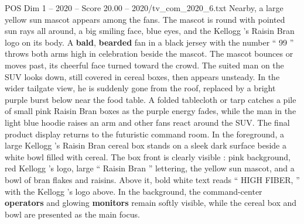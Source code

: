 \begin{textsample}{POS Dim 1 – 2020 – Score 20.00 – 2020/tv\_com\_2020\_6.txt}
Nearby, a large yellow sun mascot appears among the fans.
The mascot is round with pointed sun rays all around, a big smiling face, blue eyes, and the Kellogg ’s Raisin Bran logo on its body.
A \textbf{bald}, \textbf{bearded} fan in a black jersey with the number “ 99 ” throws both arms high in celebration beside the mascot.
The mascot bounces or moves past, its cheerful face turned toward the crowd.
The suited man on the SUV looks down, still covered in cereal boxes, then appears unsteady.
In the wider tailgate view, he is suddenly gone from the roof, replaced by a bright purple burst below near the food table.
A folded tablecloth or tarp catches a pile of small pink Raisin Bran boxes as the purple energy fades, while the man in the light blue hoodie raises an arm and other fans react around the SUV.
The final product display returns to the futuristic command room.
In the foreground, a large Kellogg ’s Raisin Bran cereal box stands on a sleek dark surface beside a white bowl filled with cereal.
The box front is clearly visible : pink background, red Kellogg ’s logo, large “ Raisin Bran ” lettering, the yellow sun mascot, and a bowl of bran flakes and raisins.
Above it, bold white text reads “ HIGH FIBER, ” with the Kellogg ’s logo above.
In the background, the command-center \textbf{operators} and glowing \textbf{monitors} remain softly visible, while the cereal box and bowl are presented as the main focus.

\end{textsample}

